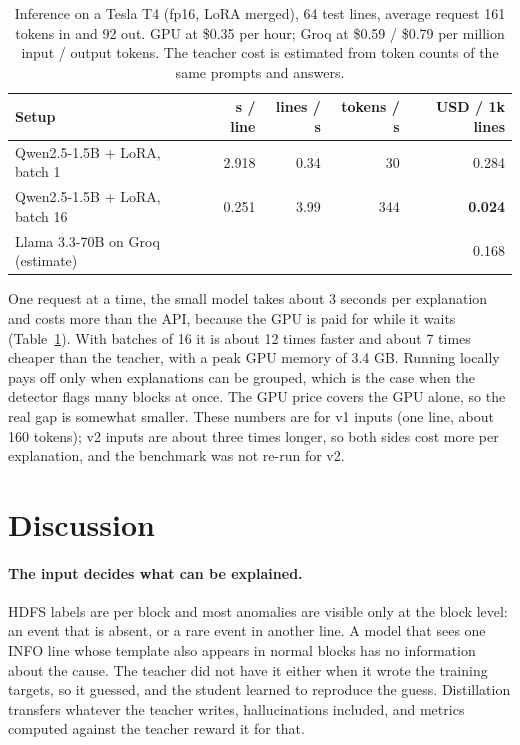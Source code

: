 \documentclass[11pt,a4paper]{article}
\begin{document}
\begin{table}[t]
\centering
\caption{Inference on a Tesla T4 (fp16, LoRA merged), 64 test lines, average request 161 tokens
in and 92 out. GPU at \$0.35 per hour; Groq at \$0.59 / \$0.79 per million input / output tokens.
The teacher cost is estimated from token counts of the same prompts and answers.}
\label{tab:cost}
\begin{tabular}{lrrrr}
\toprule
Setup & s / line & lines / s & tokens / s & USD / 1k lines \\
\midrule
Qwen2.5-1.5B + LoRA, batch 1 & 2.918 & 0.34 & 30 & 0.284 \\
Qwen2.5-1.5B + LoRA, batch 16 & 0.251 & 3.99 & 344 & \textbf{0.024} \\
Llama 3.3-70B on Groq (estimate) & & & & 0.168 \\
\bottomrule
\end{tabular}
\end{table}

One request at a time, the small model takes about 3 seconds per explanation and costs more
than the API, because the GPU is paid for while it waits (Table~\ref{tab:cost}). With batches
of 16 it is about 12 times faster and about 7 times cheaper than the teacher, with a peak GPU
memory of 3.4 GB. Running locally pays off only when explanations can be grouped, which is the
case when the detector flags many blocks at once. The GPU price covers the GPU alone, so the
real gap is somewhat smaller. These numbers are for v1 inputs (one line, about 160 tokens);
v2 inputs are about three times longer, so both sides cost more per explanation, and the
benchmark was not re-run for v2.

\section{Discussion}

\paragraph{The input decides what can be explained.} HDFS labels are per block and most
anomalies are visible only at the block level: an event that is absent, or a rare event in
another line. A model that sees one INFO line whose template also appears in normal blocks
has no information about the cause. The teacher did not have it either when it wrote the
training targets, so it guessed, and the student learned to reproduce the guess. Distillation
transfers whatever the teacher writes, hallucinations included, and metrics computed against
the teacher reward it for that.
\end{document}
